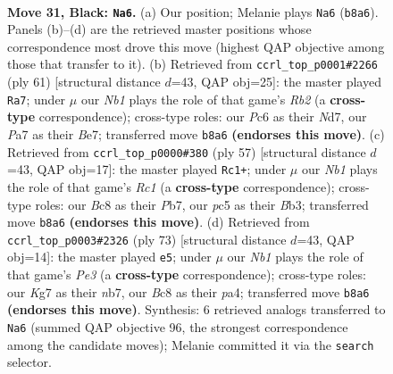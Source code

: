 \documentclass[11pt]{article}
\begin{document}
\clearpage

\begin{figure}[p]\centering
\begin{subfigure}{0.46\textwidth}\centering
\resizebox{\linewidth}{!}{%
\newchessgame
\chessboard[
  setfen={rnb5/p5k1/2p1p1P1/P1PpN3/1P6/2P5/5K2/R1B5 b - - 0 31},
  showmover=false,
  pgfstyle=straightmove, color=movearrow, markmove={b8-a6}
]}
\caption{}
\end{subfigure}\hfill
\begin{subfigure}{0.46\textwidth}\centering
\resizebox{\linewidth}{!}{%
\newchessgame
\chessboard[
  setfen={8/1r1nbk1p/8/B1p3p1/NpP5/1P5P/P2R1PK1/8 b - - 3 31},
  showmover=false,
  pgfstyle=straightmove, color=movearrow, markmove={b7-a7}
]}
\caption{}
\end{subfigure}
\\[4pt]
\begin{subfigure}{0.46\textwidth}\centering
\resizebox{\linewidth}{!}{%
\newchessgame
\chessboard[
  setfen={2r5/1p3pk1/5p2/p3p2P/6N1/Pb2PP1R/1n2B1P1/4K3 b - - 0 29},
  showmover=false,
  pgfstyle=straightmove, color=movearrow, markmove={c8-c1}
]}
\caption{}
\end{subfigure}\hfill
\begin{subfigure}{0.46\textwidth}\centering
\resizebox{\linewidth}{!}{%
\newchessgame
\chessboard[
  setfen={7r/1N6/2p1p1k1/p4p2/P5p1/2P1n1P1/1P3R1P/2K5 b - - 1 37},
  showmover=false,
  pgfstyle=straightmove, color=movearrow, markmove={e6-e5}
]}
\caption{}
\end{subfigure}
\caption{\textbf{Move 31, Black: \texttt{Na6}.} (a) Our position; Melanie plays \texttt{Na6} (\texttt{b8a6}). Panels (b)--(d) are the retrieved master positions whose correspondence most drove this move (highest QAP objective among those that transfer to it). (b) Retrieved from \texttt{ccrl\_top\_p0001\#2266} (ply 61) [structural distance $d$=43, QAP obj=25]: the master played \texttt{Ra7}; under $\mu$ our \emph{Nb1} plays the role of that game's \emph{Rb2} (a \textbf{cross-type} correspondence); cross-type roles: our \emph{P}c6 as their \emph{N}d7, our \emph{P}a7 as their \emph{B}e7; transferred move \texttt{b8a6} \textbf{(endorses this move)}. (c) Retrieved from \texttt{ccrl\_top\_p0000\#380} (ply 57) [structural distance $d$=43, QAP obj=17]: the master played \texttt{Rc1+}; under $\mu$ our \emph{Nb1} plays the role of that game's \emph{Rc1} (a \textbf{cross-type} correspondence); cross-type roles: our \emph{B}c8 as their \emph{P}b7, our \emph{p}c5 as their \emph{B}b3; transferred move \texttt{b8a6} \textbf{(endorses this move)}. (d) Retrieved from \texttt{ccrl\_top\_p0003\#2326} (ply 73) [structural distance $d$=43, QAP obj=14]: the master played \texttt{e5}; under $\mu$ our \emph{Nb1} plays the role of that game's \emph{Pe3} (a \textbf{cross-type} correspondence); cross-type roles: our \emph{K}g7 as their \emph{n}b7, our \emph{B}c8 as their \emph{p}a4; transferred move \texttt{b8a6} \textbf{(endorses this move)}. Synthesis: 6 retrieved analogs transferred to \texttt{Na6} (summed QAP objective 96, the strongest correspondence among the candidate moves); Melanie committed it via the \texttt{search} selector.}
\label{fig:thought-m61}
\end{figure}
\end{document}
